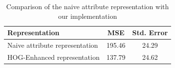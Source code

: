 \documentclass[9pt]{IEEEtran}
\begin{document}
\vspace{5pt}
\begin{table}[h!]
\centering
\begin{tabular}{lcc}
Representation         & MSE    & Std. Error \\
\hline
Naive attribute representation         & 195.46 & 24.29      \\
HOG-Enhanced representation  & 137.79 & 24.62      \\
\end{tabular}
\vspace{5pt}
\caption{Comparison of the naive attribute representation with our implementation}
\label{tab:res}
\end{table}





\end{document}
